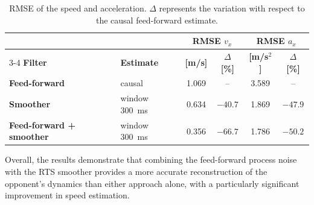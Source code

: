 \begin{table}[H]
\centering
\small
\begin{tabular}{|llcccc|}
\hline
\rowcolor{bluepoli!40} & &\multicolumn{2}{c}{\textbf{RMSE $v_x$}}&\multicolumn{2}{c|}{\textbf{RMSE $a_x$}} \\
\cline{3-4}\cline{5-6}
\rowcolor{bluepoli!40} \textbf{Filter} & \textbf{Estimate} & \textbf{[m/s]} & \textbf{$\Delta$ [\%]} & \textbf{[m/s$^2$]} & \textbf{$\Delta$ [\%]} \\
\hline\hline
\textbf{Feed-forward} & causal & 1.069 & -- & 3.589 & -- \\
\textbf{Smoother} & window \SI{300}{ms} & 0.634 & $-40.7$ & 1.869 & $-47.9$ \\
\textbf{Feed-forward + smoother} & window \SI{300}{ms} & 0.356 & $-66.7$ & 1.786 & $-50.2$ \\
\hline
\end{tabular}
\caption{RMSE of the speed and acceleration. $\Delta$ represents the variation with respect to the causal feed-forward estimate.}
\label{tab:rts_qff}
\end{table}

Overall, the results demonstrate that combining the feed-forward process noise with the RTS smoother provides a more accurate reconstruction of the opponent's dynamics than either approach alone, with a particularly significant improvement in speed estimation.
